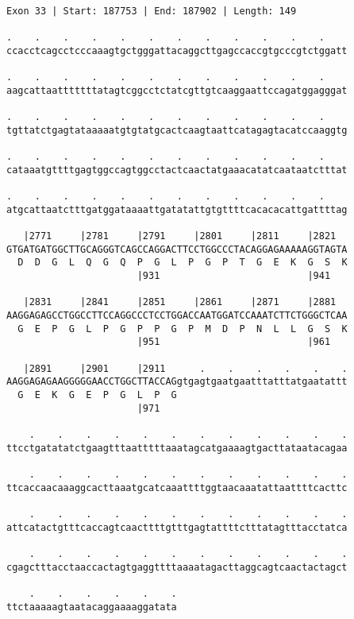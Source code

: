\documentclass{article}
\begin{document}
\begin{Verbatim}
Exon 33 | Start: 187753 | End: 187902 | Length: 149
 
.    .    .    .    .    .    .    .    .    .    .    .    
ccacctcagcctcccaaagtgctgggattacaggcttgagccaccgtgcccgtctggatt
  
.    .    .    .    .    .    .    .    .    .    .    .    
aagcattaatttttttatagtcggcctctatcgttgtcaaggaattccagatggagggat
  
.    .    .    .    .    .    .    .    .    .    .    .    
tgttatctgagtataaaaatgtgtatgcactcaagtaattcatagagtacatccaaggtg
  
.    .    .    .    .    .    .    .    .    .    .    .    
cataaatgttttgagtggccagtggcctactcaactatgaaacatatcaataatctttat
  
.    .    .    .    .    .    .    .    .    .    .    .    
atgcattaatctttgatggataaaattgatatattgtgttttcacacacattgattttag
  
   |2771     |2781     |2791     |2801     |2811     |2821  
GTGATGATGGCTTGCAGGGTCAGCCAGGACTTCCTGGCCCTACAGGAGAAAAAGGTAGTA
  D  D  G  L  Q  G  Q  P  G  L  P  G  P  T  G  E  K  G  S  K
                       |931                          |941   
  
   |2831     |2841     |2851     |2861     |2871     |2881  
AAGGAGAGCCTGGCCTTCCAGGCCCTCCTGGACCAATGGATCCAAATCTTCTGGGCTCAA
  G  E  P  G  L  P  G  P  P  G  P  M  D  P  N  L  L  G  S  K
                       |951                          |961   
  
   |2891     |2901     |2911      .    .    .    .    .    .
AAGGAGAGAAGGGGGAACCTGGCTTACCAGgtgagtgaatgaatttatttatgaatattt
  G  E  K  G  E  P  G  L  P  G                              
                       |971                                 
  
    .    .    .    .    .    .    .    .    .    .    .    .
ttcctgatatatctgaagtttaatttttaaatagcatgaaaagtgacttataatacagaa
  
    .    .    .    .    .    .    .    .    .    .    .    .
ttcaccaacaaaggcacttaaatgcatcaaattttggtaacaaatattaattttcacttc
  
    .    .    .    .    .    .    .    .    .    .    .    .
attcatactgtttcaccagtcaacttttgtttgagtattttctttatagtttacctatca
  
    .    .    .    .    .    .    .    .    .    .    .    .
cgagctttacctaaccactagtgaggttttaaaatagacttaggcagtcaactactagct
  
    .    .    .    .    .    .
ttctaaaaagtaatacaggaaaaggatata
\end{Verbatim}
\end{document}
